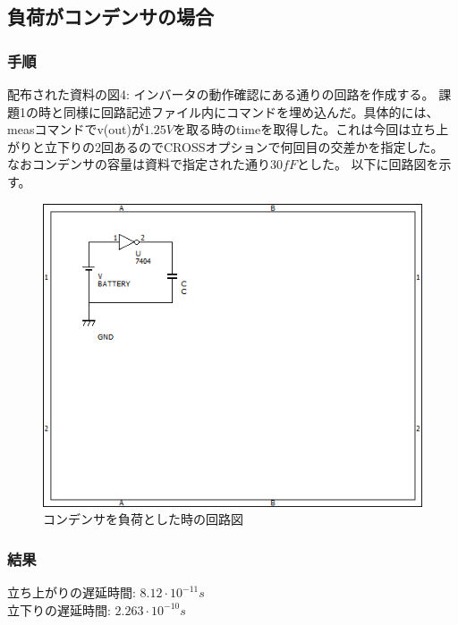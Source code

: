 \documentclass{jsarticle}
\begin{document}
\subsection{負荷がコンデンサの場合}
\subsubsection{手順}
配布された資料の図4: インバータの動作確認にある通りの回路を作成する。
課題1の時と同様に回路記述ファイル内にコマンドを埋め込んだ。具体的には、measコマンドでv(out)が$1.25V$を取る時のtimeを取得した。これは今回は立ち上がりと立下りの2回あるのでCROSSオプションで何回目の交差かを指定した。
なおコンデンサの容量は資料で指定された通り$30fF$とした。
以下に回路図を示す。
\begin{figure}[H]
    \centering
    \includegraphics[bb=0 0 500 400]{ex2_1.png}
    \caption{コンデンサを負荷とした時の回路図}
\end{figure}
\subsubsection{結果}
\begin{flushleft}
立ち上がりの遅延時間: $8.12 \cdot 10^{-11} s$\\
立下りの遅延時間: $2.263 \cdot 10^{-10} s$
\end{flushleft}
\end{document}
